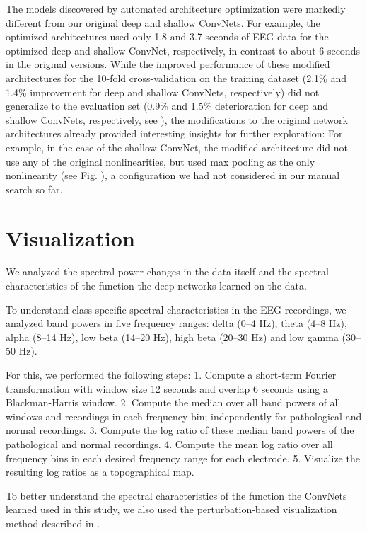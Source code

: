    The models discovered by automated architecture optimization were
markedly different from our original deep and shallow ConvNets. For
example, the optimized architectures used only 1.8 and 3.7 seconds of
EEG data for the optimized deep and shallow ConvNet, respectively, in
contrast to about 6 seconds in the original versions. While the improved
performance of these modified architectures for the 10-fold
cross-validation on the training dataset (2.1\% and 1.4\% improvement
for deep and shallow ConvNets, respectively) did not generalize to the
evaluation set (0.9\% and 1.5\% deterioration for deep and shallow
ConvNets, respectively, see ),
the modifications to the original network architectures already provided
interesting insights for further exploration: For example, in the case
of the shallow ConvNet, the modified architecture did not use any of the
original nonlinearities, but used max pooling as the only nonlinearity
(see Fig. ), a configuration we
had not considered in our manual search so far.

    \hypertarget{visualization}{%
\section{Visualization}\label{visualization}}

    We analyzed the spectral power changes in the data itself and the
spectral characteristics of the function the deep networks learned on
the data.

    To understand class-specific spectral characteristics in the EEG
recordings, we analyzed band powers in five frequency ranges: delta
(0--4 Hz), theta (4--8 Hz), alpha (8--14 Hz), low beta (14--20 Hz), high
beta (20--30 Hz) and low gamma (30--50 Hz).

For this, we performed the following steps: 1. Compute a short-term
Fourier transformation with window size 12 seconds and overlap 6 seconds
using a Blackman-Harris window. 2. Compute the median over all band
powers of all windows and recordings in each frequency bin;
independently for pathological and normal recordings. 3. Compute the log
ratio of these median band powers of the pathological and normal
recordings. 4. Compute the mean log ratio over all frequency bins in
each desired frequency range for each electrode. 5. Visualize the
resulting log ratios as a topographical map.

To better understand the spectral characteristics of the function the
ConvNets learned used in this study, we also used the perturbation-based
visualization method described in
\citet{schirrmeisterdeephbm2017}.

